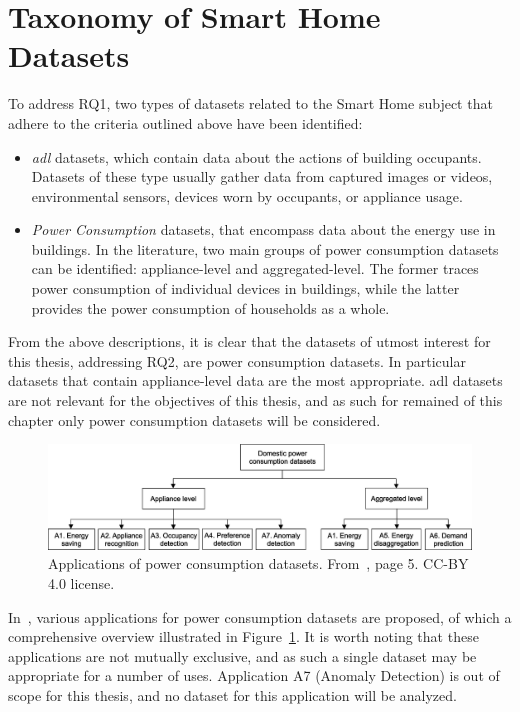 \newpage

\section{Taxonomy of Smart Home Datasets}

To address RQ1, two types of datasets related to the Smart Home subject that adhere to the criteria outlined above have been identified:
\begin{itemize}
    \item \textit{\acrfull{adl}} datasets, which contain data about the actions of building occupants. Datasets of these type usually gather data from captured images or videos, environmental sensors, devices worn by occupants, or appliance usage.
    \item \textit{Power Consumption} datasets, that encompass data about the energy use in buildings. In the literature, two main groups of power consumption datasets can be identified: appliance-level and aggregated-level. The former traces power consumption of individual devices in buildings, while the latter provides the power consumption of households as a whole.
\end{itemize}
From the above descriptions, it is clear that the datasets of utmost interest for this thesis, addressing RQ2, are power consumption datasets. In particular datasets that contain appliance-level data are the most appropriate. \acrshort{adl} datasets are not relevant for the objectives of this thesis, and as such for remained of this chapter only power consumption datasets will be considered.

\begin{figure}[h]
    \centering
    \includegraphics[width=.9\textwidth]{images/taxonomy_power_consumption.jpg}
    \caption[Applications of power consumption datasets]{Applications of power consumption datasets. From~\cite{himeurBuildingPowerConsumption2020}, page 5. CC-BY 4.0 license.}
    \label{fig:applications_power_consumption_datasets}
\end{figure}

In~\parencite{himeurBuildingPowerConsumption2020}, various applications for power consumption datasets are proposed, of which a comprehensive overview illustrated in Figure~\ref{fig:applications_power_consumption_datasets}. It is worth noting that these applications are not mutually exclusive, and as such a single dataset may be appropriate for a number of uses. Application A7 (Anomaly Detection) is out of scope for this thesis, and no dataset for this application will be analyzed.

